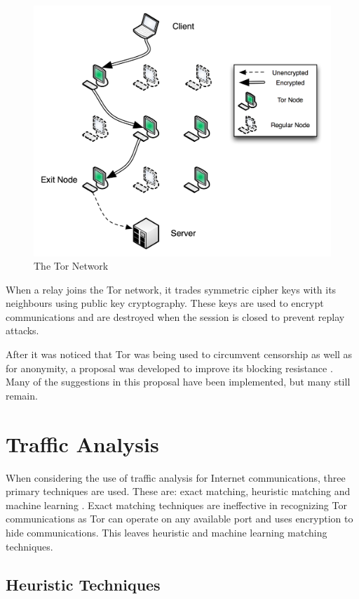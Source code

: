 \documentclass{conference}
\begin{document}
\begin{figure}[H]
\center \includegraphics{tor-network-diagram}
\caption{The Tor Network}
\label{tor-network}
\end{figure}

When a relay joins the Tor network, it trades symmetric cipher keys with its neighbours using public key cryptography. These keys are used to encrypt communications and are destroyed when the session is closed to prevent replay attacks.

After it was noticed that Tor was being used to circumvent censorship as well as for anonymity, a proposal was developed to improve its blocking resistance \citep{Dingledine:2008p1542}. Many of the suggestions in this proposal have been implemented, but many still remain.

\section{Traffic Analysis}

When considering the use of traffic analysis for Internet communications, three primary techniques are used. These are: exact matching, heuristic matching and machine learning \citep{Zhang:2009p1188}. Exact matching techniques are ineffective in recognizing Tor communications as Tor can operate on any available port and uses encryption to hide communications. This leaves heuristic and machine learning matching techniques.

\subsection{Heuristic Techniques}
\end{document}
